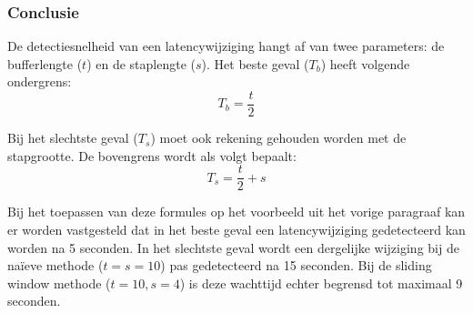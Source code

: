 \subsubsection{Conclusie}

De detectiesnelheid van een latencywijziging hangt af van twee parameters: de bufferlengte ($t$) en de staplengte ($s$). Het beste geval ($ T_b $) heeft volgende ondergrens:
\begin{equation}
T_b = \frac{t}{2}
\end{equation}

Bij het slechtste geval ($ T_s $) moet ook rekening gehouden worden met de stapgrootte. De bovengrens wordt als volgt bepaalt:
\begin{equation}
T_s = \frac{t}{2} + s
\end{equation}

Bij het toepassen van deze formules op het voorbeeld uit het vorige paragraaf kan er worden vastgesteld dat in het beste geval een latencywijziging gedetecteerd kan worden na 5 seconden. In het slechtste geval wordt een dergelijke wijziging bij de naïeve methode ($t = s = 10 $) pas gedetecteerd na 15 seconden. Bij de sliding window methode ($t = 10, s = 4 $) is deze wachttijd echter begrensd tot maximaal 9 seconden.

